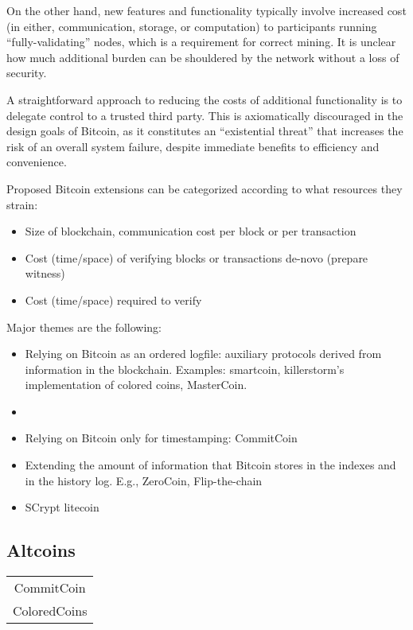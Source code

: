 On the other hand, new features and functionality typically involve increased cost (in either, communication, storage, or computation) to participants running ``fully-validating'' nodes, which is a requirement for correct mining. It is unclear how much additional burden can be shouldered by the network without a loss of security.

A straightforward approach to reducing the costs of additional functionality is to delegate control to a trusted third party. This is axiomatically discouraged in the design goals of Bitcoin, as it constitutes an ``existential threat'' that increases the risk of an overall system failure, despite immediate benefits to efficiency and convenience.
 
Proposed Bitcoin extensions can be categorized according to what resources they strain:
\begin{itemize}
\item Size of blockchain, communication cost per block or per transaction
\item Cost (time/space) of verifying blocks or transactions de-novo (prepare witness)
\item Cost (time/space) required to verify
\end{itemize}

Major themes are the following:
\begin{itemize}
\item Relying on Bitcoin as an ordered logfile: auxiliary protocols derived from information in the blockchain. Examples: smartcoin, killerstorm's implementation of colored coins, MasterCoin.
\item 
\item Relying on Bitcoin only for timestamping: CommitCoin
\item Extending the amount of information that Bitcoin stores in the indexes and in the history log. E.g., ZeroCoin, Flip-the-chain
\item SCrypt litecoin
\end{itemize}


\cite{jgarzik-smartcoin}
\cite{miller2001capability}
\cite{szabo1997formalizing,bitcointalk-bondmarkets,wiki-distributedmarkets}


\subsection{Altcoins}



\begin{table}
\begin{tabular}{c}
CommitCoin \\
ColoredCoins \\
\end{tabular}
\end{table}
